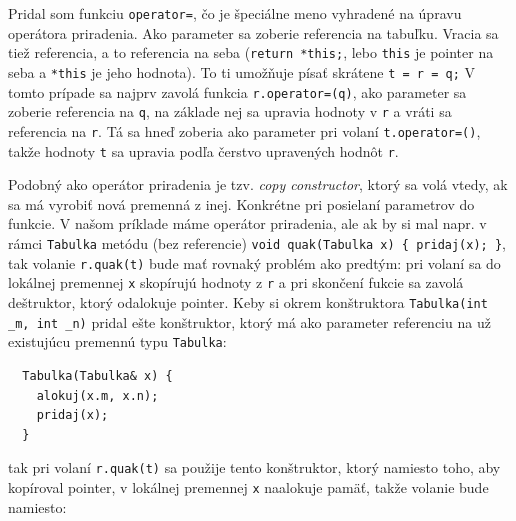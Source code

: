 \documentclass[10pt]{article}
\def\prg{\lstinline}
\def\ods{\vspace*{10pt}}
\begin{document}
Pridal som funkciu \prg!operator=!, čo je špeciálne meno vyhradené na úpravu operátora 
priradenia.  Ako parameter sa zoberie referencia na tabuľku. Vracia sa tiež referencia,
a to referencia na seba (\prg!return *this;!, lebo \prg!this! je pointer na seba
a \prg!*this! je jeho hodnota). To ti umožňuje písať skrátene
\prg!t = r = q;! V tomto prípade sa najprv zavolá funkcia \prg!r.operator=(q)!, ako 
parameter sa zoberie referencia na {\tt q}, na základe nej sa upravia hodnoty v {\tt r}
a vráti sa referencia na {\tt r}. Tá sa hneď zoberia ako parameter pri volaní
\prg!t.operator=()!, takže hodnoty {\tt t} sa upravia podľa čerstvo upravených hodnôt {\tt r}.

\ods Podobný ako operátor priradenia je tzv. {\em copy constructor}, ktorý sa volá
vtedy, ak sa má vyrobiť nová premenná z inej. Konkrétne pri posielaní parametrov do funkcie.
V našom príklade máme operátor priradenia, ale ak by si mal napr. v rámci {\tt Tabulka}
metódu (bez referencie)
\prg!void quak(Tabulka x) { pridaj(x); }!, tak volanie \prg!r.quak(t)! bude 
mať rovnaký problém ako predtým: pri volaní sa do lokálnej premennej {\tt x}
skopírujú hodnoty
z {\tt r} a pri skončení fukcie sa zavolá deštruktor, ktorý odalokuje pointer.
Keby si okrem konštruktora \prg!Tabulka(int _m, int _n)! pridal ešte
konštruktor, ktorý má ako parameter referenciu na už existujúcu premennú typu
{\tt Tabulka}:

\begin{lstlisting}
  Tabulka(Tabulka& x) {
    alokuj(x.m, x.n);
    pridaj(x);
  }
\end{lstlisting}

tak pri volaní {\tt r.quak(t)} sa použije tento konštruktor, ktorý namiesto toho,
aby kopíroval pointer, v lokálnej premennej
{\tt x} naalokuje pamäť, takže volanie bude namiesto:

\ods
{}
\end{document}
